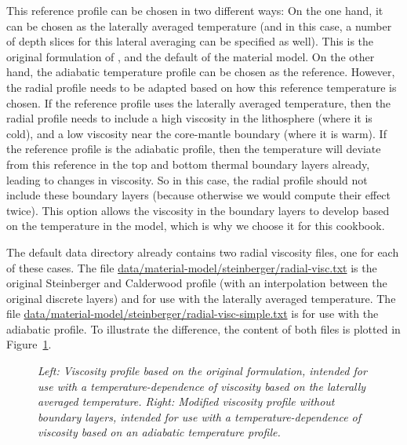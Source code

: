 This reference profile can be chosen in two different ways: On the one hand, it can be chosen as the laterally averaged temperature (and in this case, a number of depth slices for this lateral averaging can be specified as  well). This is the original formulation of \cite{stca06}, and the default of the material model. 
On the other hand, the adiabatic temperature profile can be chosen as the reference. 
However, the radial profile needs to be adapted based on how this reference temperature is chosen. 
If the reference profile uses the laterally averaged temperature, then the radial profile needs to include a high viscosity in the lithosphere (where it is cold), and a low viscosity near the core-mantle boundary (where it is warm). If the reference profile is the adiabatic profile, then the temperature will deviate from this reference in the top and bottom thermal boundary layers already, leading to changes in viscosity. So in this case, the radial profile should not include these boundary layers (because otherwise we would compute their effect twice). This option allows the viscosity in the boundary layers to develop based on the temperature in the model, which is why we choose it for this cookbook. 

The default data directory already contains two radial viscosity files, one for each of these cases. 
The file \url{data/material-model/steinberger/radial-visc.txt} is the original Steinberger and Calderwood \cite{stca06} profile (with an interpolation between the original discrete layers) and for use with the laterally averaged temperature. The file \url{data/material-model/steinberger/radial-visc-simple.txt} is for use with the adiabatic profile. To illustrate the difference, the content of both files is plotted in Figure~\ref{fig:steinberger-viscosity}. 

\begin{figure}
  
  
  \caption{\it Left: Viscosity profile based on the original \cite{stca06} formulation, intended for use with a temperature-dependence of viscosity based on the laterally averaged temperature. Right: Modified viscosity profile without boundary layers, intended for use with a temperature-dependence of viscosity based on an adiabatic temperature profile.}
  \label{fig:steinberger-viscosity}
\end{figure}

